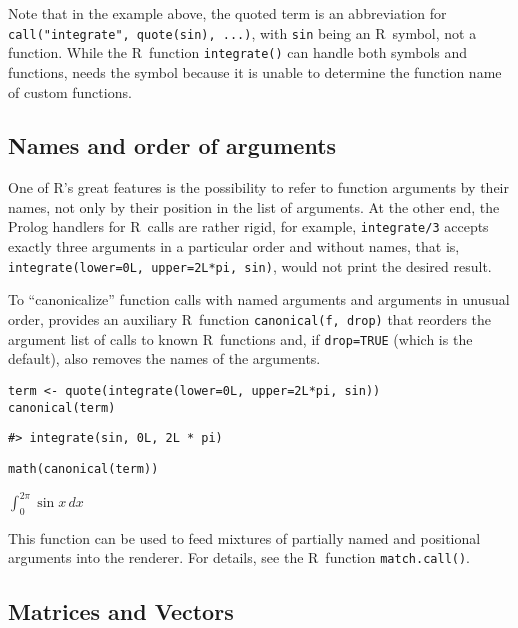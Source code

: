 Note that in the example above, the quoted term is an abbreviation
for \texttt{call("integrate",\ quote(sin),\ ...)}, with \texttt{sin} being an R~symbol, not a
function. While the R~function \texttt{integrate()} can handle both symbols and
functions,  needs the symbol because it is unable to determine the
function name of custom functions.

\hypertarget{names-and-order-of-arguments}{%
\subsection{Names and order of arguments}\label{names-and-order-of-arguments}}

One of R's great features is the possibility to refer to function arguments by
their names, not only by their position in the list of arguments. At the other
end, the Prolog handlers for R~calls are rather rigid, for
example, \texttt{integrate/3} accepts exactly three arguments in a particular order and
without names, that is, \texttt{integrate(lower=0L,\ upper=2L*pi,\ sin)}, would not print
the desired result.

To ``canonicalize'' function calls with named arguments and arguments in unusual
order,  provides an auxiliary R~function \texttt{canonical(f,\ drop)} that
reorders the argument list of calls to known R~functions and,
if \texttt{drop=TRUE} (which is the default), also removes the names of the arguments.

\begin{verbatim}
term <- quote(integrate(lower=0L, upper=2L*pi, sin))
canonical(term)
\end{verbatim}

\begin{verbatim}
#> integrate(sin, 0L, 2L * pi)
\end{verbatim}

\begin{verbatim}
math(canonical(term))
\end{verbatim}

\(\int_{0}^{{2}{{}}{\pi}}{\sin{x}}\,{d{x}}\)

This function can be used to feed mixtures of partially named and positional
arguments into the renderer. For details, see the R~function \texttt{match.call()}.

\hypertarget{matrices-and-vectors}{%
\subsection{Matrices and Vectors}\label{matrices-and-vectors}}

